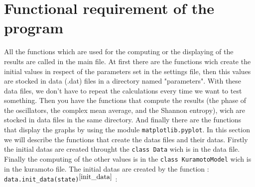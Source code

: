 \documentclass[1pt, a4paper]{article}
\begin{document}
\maketitlepage
\tableofcontents
\newpage
\noindent
\section{Functional requirement of the program}
\noindent
All the functions which are used for the computing or the displaying of the results are called in the main file. At first there are the functions wich create the initial values in respect of the parameters set in the settings file, then this values are stocked in data (.dat) files in a directory named "parameters". With these data files, we don't have to repeat the calculations every time we want to test something. Then you have the functions that compute the results (the phase of the oscillators, the complex mean average, and the Shannon entropy), wich are stocked in data files in the same directory. And finally there are the functions that display the graphs by using the module \texttt{matplotlib.pyplot}. In this section we will describe the functions that create the datas files and their datas. Firstly the initial datas are created throught the \texttt{class Data} wich is in the data file. Finally the computing of the other values is in the \texttt{class KuramotoModel} wich is in the kuramoto file.
The initial datas are created by the function : \texttt{data.init_data(state)}$^{\ref{init_data}}$ :  
\end{document}
